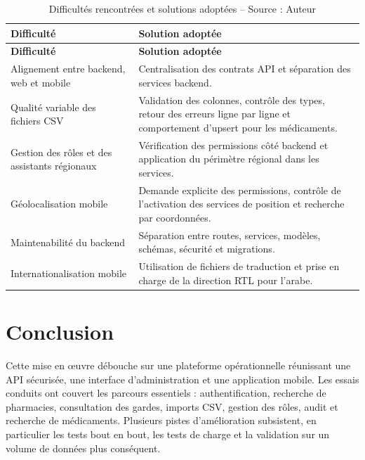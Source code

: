 \begin{longtable}{L{5cm}L{9cm}}
    \caption{Difficultés rencontrées et solutions adoptées -- Source : Auteur}\label{tab:difficultes}\\
    \toprule
    \textbf{Difficulté} & \textbf{Solution adoptée} \\
    \midrule
    \endfirsthead
    \toprule
    \textbf{Difficulté} & \textbf{Solution adoptée} \\
    \midrule
    \endhead
    Alignement entre backend, web et mobile & Centralisation des contrats API et séparation des services backend. \\
    Qualité variable des fichiers CSV & Validation des colonnes, contrôle des types, retour des erreurs ligne par ligne et comportement d'upsert pour les médicaments. \\
    Gestion des rôles et des assistants régionaux & Vérification des permissions côté backend et application du périmètre régional dans les services. \\
    Géolocalisation mobile & Demande explicite des permissions, contrôle de l'activation des services de position et recherche par coordonnées. \\
    Maintenabilité du backend & Séparation entre routes, services, modèles, schémas, sécurité et migrations. \\
    Internationalisation mobile & Utilisation de fichiers de traduction et prise en charge de la direction RTL pour l'arabe. \\
    \bottomrule
\end{longtable}

\section{Conclusion}

Cette mise en œuvre débouche sur une plateforme opérationnelle réunissant une API sécurisée, une interface
d'administration et une application mobile. Les essais conduits ont couvert les parcours essentiels :
authentification, recherche de pharmacies, consultation des gardes, imports CSV, gestion des rôles, audit
et recherche de médicaments. Plusieurs pistes d'amélioration subsistent, en particulier les tests bout en
bout, les tests de charge et la validation sur un volume de données plus conséquent.

